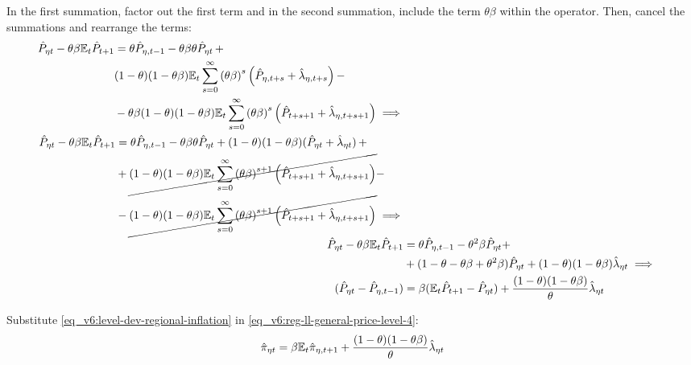 \documentclass[../thesis.tex]{subfiles}
\begin{document}
In the first summation, factor out the first term and in the second summation, include the term $\theta \beta$ within the operator. Then, cancel the summations and rearrange the terms:
\begin{align}
	\begin{split}
		\hat{P}_{\eta t} - \theta \beta {\mathbb{E}_{t}} \hat{P}_{t+1} &= \theta \hat{P}_{\eta, t-1} - \theta \beta \theta \hat{P}_{\eta t} \, + \\
		& (1-\theta) (1- \theta \beta) {\mathbb{E}_{t}} \sum_{s=0}^{\infty} \left( \theta \beta \right)^s \left( \hat{P}_{\eta, t+s} + \hat{\lambda}_{\eta, t+s} \right) -
		\\
		& - \theta \beta (1-\theta) (1- \theta \beta) {\mathbb{E}_{t}} \sum_{s=0}^{\infty} \left( \theta \beta \right)^s \left( \hat{P}_{t+s+1} + \hat{\lambda}_{\eta, t+s+1} \right) \implies \nonumber 
	\end{split} \\
	\begin{split}
		\hat{P}_{\eta t} - \theta \beta {\mathbb{E}_{t}} \hat{P}_{t+1} &= \theta \hat{P}_{\eta, t-1} - \theta \beta \theta \hat{P}_{\eta t} + (1-\theta) (1- \theta \beta) (\hat{P}_{\eta t} + \hat{\lambda}_{\eta t}) \, + 
		\\
		& + \cancel{(1-\theta) (1- \theta \beta) {\mathbb{E}_{t}} \sum_{s=0}^{\infty} \left( \theta \beta \right)^{s+1} \left( \hat{P}_{t+s+1} + \hat{\lambda}_{\eta, t+s+1} \right)} -
		\\
		& - \cancel{(1-\theta) (1- \theta \beta) {\mathbb{E}_{t}} \sum_{s=0}^{\infty} \left( \theta \beta \right)^{s+1} \left( \hat{P}_{t+s+1} + \hat{\lambda}_{\eta, t+s+1} \right)} \implies \nonumber 
	\end{split} \\
	\hat{P}_{\eta t} - \theta \beta {\mathbb{E}_{t}} \hat{P}_{t+1} &= \theta \hat{P}_{\eta, t-1} - \theta^2 \beta \hat{P}_{\eta t} + \nonumber \\
	& + (1- \theta -\theta \beta + \theta^2 \beta) \hat{P}_{\eta t} + (1-\theta) (1- \theta \beta) \hat{\lambda}_{\eta t} \implies \nonumber \\
	(\hat{P}_{\eta t} - \hat{P}_{\eta, t-1}) &= \beta ({\mathbb{E}_{t}} \hat{P}_{t+1} - \hat{P}_{\eta t}) + \frac{(1-\theta) (1- \theta \beta)}{\theta} \hat{\lambda}_{\eta t}
	\label{eq_v6:reg-ll-general-price-level-4}
\end{align}

Substitute \ref{eq_v6:level-dev-regional-inflation} in \ref{eq_v6:reg-ll-general-price-level-4}:
\begin{align}
	\hat{\pi}_{\eta t} = \beta {\mathbb{E}_{t}} \hat{\pi}_{\eta, t+1} + \frac{(1-\theta) (1- \theta \beta)}{\theta} \hat{\lambda}_{\eta t} \label{eq_v6:reg-nk-phillips-curve-mc}
\end{align}
\end{document}
